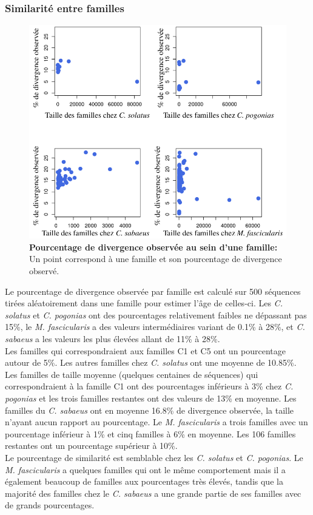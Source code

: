 \documentclass[12pt,a4paper]{article}
\begin{document}
			\subsubsection{Similarité entre familles}
\begin{figure}	
	\center
	\includegraphics[scale=0.4]{img/graphique_similarity.png}
	\caption{\textbf{Pourcentage de divergence observée au sein d'une famille:}
	Un point correspond à une famille et son pourcentage de divergence observé.
	\label{fig:divergence}
		} 
\end{figure}
	Le pourcentage de divergence observée par famille est calculé sur 500 séquences tirées aléatoirement dans une famille pour estimer l'âge de celles-ci. Les \textit{C. solatus} et \textit{C. pogonias} ont des pourcentages relativement faibles ne dépassant pas 15\%, le \textit{M. fascicularis} a des valeurs intermédiaires variant de 0.1\% à 28\%, et \textit{C. sabaeus} a les valeurs les plus élevées allant de 11\% à 28\%.\\
	Les familles qui correspondraient aux familles C1 et C5 ont un pourcentage autour de 5\%. Les autres familles chez \textit{C. solatus} ont une moyenne de 10.85\%. Les familles de taille moyenne (quelques centaines de séquences) qui correspondraient à la famille C1 ont des pourcentages inférieurs à 3\% chez \textit{C. pogonias} et les trois familles restantes ont des valeurs de 13\% en moyenne. Les familles du \textit{C. sabaeus} ont en moyenne 16.8\% de divergence observée, la taille n'ayant aucun rapport au pourcentage. Le \textit{M. fascicularis} a trois familles avec un pourcentage inférieur à 1\% et cinq familles à 6\% en moyenne. Les 106 familles restantes ont un pourcentage supérieur à 10\%.\\
	Le pourcentage de similarité est semblable chez les \textit{C. solatus} et \textit{C. pogonias}. Le \textit{M. fascicularis} a  quelques familles qui ont le même comportement mais il a également beaucoup de familles aux pourcentages très élevés, tandis que la majorité des familles chez le \textit{C. sabaeus} a une grande partie de ses familles avec de grands pourcentages.
	
\end{document}
